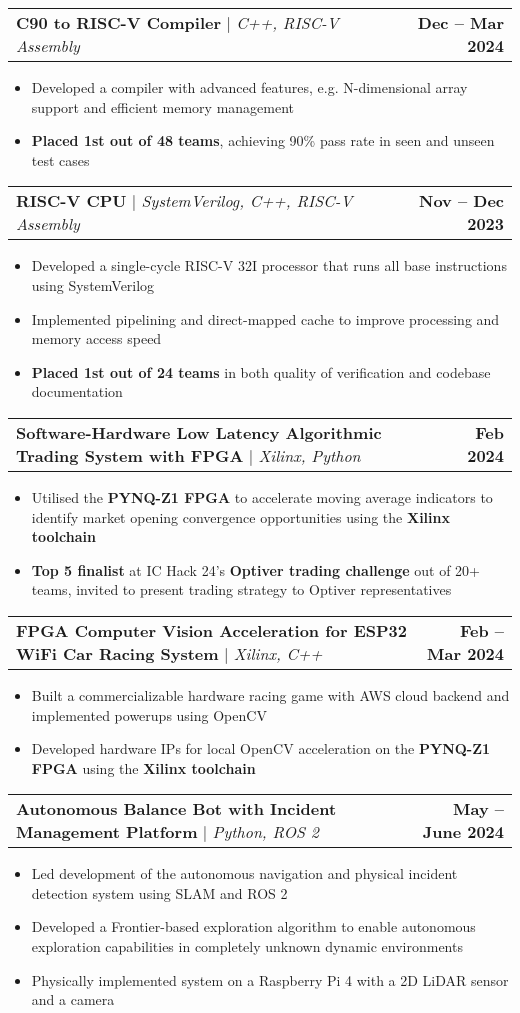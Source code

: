 \documentclass[a4paper,11pt]{article}
\makeatletter
\newcommand{\resumeItem}[1]{
  \item\small{
    {#1 \vspace{-2pt}}
  }
}
\newcommand{\resumeProjectHeading}[2]{
    \item
    \begin{tabular*}{1.001\textwidth}{l@{\extracolsep{\fill}}r}
      \small#1 & \textbf{\small #2}\\
    \end{tabular*}\vspace{-7pt}
}
\newcommand{\resumeItemListStart}{\begin{itemize}}
\newcommand{\resumeItemListEnd}{\end{itemize}\vspace{-5pt}}
\makeatother
\begin{document}
\resumeProjectHeading
{\textbf{C90 to RISC-V Compiler} \href{https://github.com/saturn691/ReaverCompiler}{\scalebox{0.75}\faLink} $|$ \emph{C++, RISC-V Assembly}}{Dec -- Mar 2024}
\resumeItemListStart
\resumeItem{Developed a compiler with advanced features, e.g. N-dimensional array support and efficient memory management}
\resumeItem{\textbf{Placed 1st out of 48 teams}, achieving 90\% pass rate in seen and unseen test cases}
\resumeItemListEnd

\resumeProjectHeading
{\textbf{RISC-V CPU} \href{https://github.com/booth-algo/RISC-V-T24}{\scalebox{0.75}\faLink} $|$ \emph{SystemVerilog, C++, RISC-V Assembly}}{Nov -- Dec 2023}
\resumeItemListStart
\resumeItem{Developed a single-cycle RISC-V 32I processor that runs all base instructions using SystemVerilog}
\resumeItem{Implemented pipelining and direct-mapped cache to improve processing and memory access speed}
\resumeItem{\textbf{Placed 1st out of 24 teams} in both quality of verification and codebase documentation}
\resumeItemListEnd

\resumeProjectHeading
{\textbf{Software-Hardware Low Latency Algorithmic Trading System with FPGA} $|$ \emph{Xilinx, Python}}{Feb 2024}
\resumeItemListStart
\resumeItem{Utilised the \textbf{PYNQ-Z1 FPGA} to accelerate moving average indicators to identify market opening convergence opportunities using the \textbf{Xilinx toolchain}}
\resumeItem{\textbf{Top 5 finalist} at IC Hack 24's \textbf{Optiver trading challenge} out of 20+ teams, invited to present trading strategy to Optiver representatives}
\resumeItemListEnd

\resumeProjectHeading
{\textbf{FPGA Computer Vision Acceleration for ESP32 WiFi Car Racing System} $|$ \emph{Xilinx, C++}}{Feb -- Mar 2024}
\resumeItemListStart
\resumeItem{Built a commercializable hardware racing game with AWS cloud backend and implemented powerups using OpenCV}
\resumeItem{Developed hardware IPs for local OpenCV acceleration on the \textbf{PYNQ-Z1 FPGA} using the \textbf{Xilinx toolchain}}
\resumeItemListEnd

\resumeProjectHeading
{\textbf{Autonomous Balance Bot with Incident Management Platform} \href{https://github.com/TorturedEngineersDept/BalanceBot}{\scalebox{0.75}\faLink} $|$ \emph{Python, ROS 2}}{May -- June 2024}
\resumeItemListStart
\resumeItem{Led development of the autonomous navigation and physical incident detection system using SLAM and ROS 2}
\resumeItem{Developed a Frontier-based exploration algorithm to enable autonomous exploration capabilities in completely unknown dynamic environments}
\resumeItem{Physically implemented system on a Raspberry Pi 4 with a 2D LiDAR sensor and a camera}
\resumeItemListEnd
\end{document}
